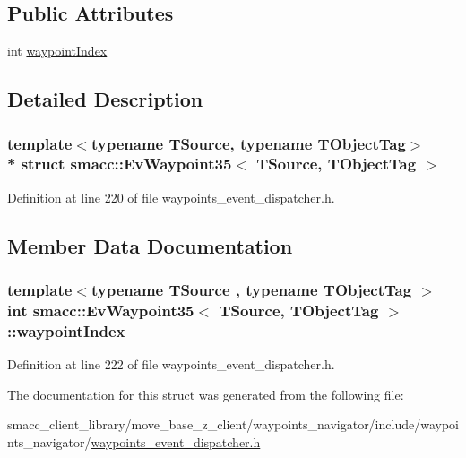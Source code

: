 \subsection*{Public Attributes}
\begin{DoxyCompactItemize}
\item 
int \hyperlink{structsmacc_1_1EvWaypoint35_a3caf329d3822d8b8daa1498c97523677}{waypoint\+Index}
\end{DoxyCompactItemize}


\subsection{Detailed Description}
\subsubsection*{template$<$typename T\+Source, typename T\+Object\+Tag$>$\\*
struct smacc\+::\+Ev\+Waypoint35$<$ T\+Source, T\+Object\+Tag $>$}



Definition at line 220 of file waypoints\+\_\+event\+\_\+dispatcher.\+h.



\subsection{Member Data Documentation}
\subsubsection[{\texorpdfstring{waypoint\+Index}{waypointIndex}}]{\setlength{\rightskip}{0pt plus 5cm}template$<$typename T\+Source , typename T\+Object\+Tag $>$ int {\bf smacc\+::\+Ev\+Waypoint35}$<$ T\+Source, T\+Object\+Tag $>$\+::waypoint\+Index}\hypertarget{structsmacc_1_1EvWaypoint35_a3caf329d3822d8b8daa1498c97523677}{}\label{structsmacc_1_1EvWaypoint35_a3caf329d3822d8b8daa1498c97523677}


Definition at line 222 of file waypoints\+\_\+event\+\_\+dispatcher.\+h.



The documentation for this struct was generated from the following file\+:\begin{DoxyCompactItemize}
\item 
smacc\+\_\+client\+\_\+library/move\+\_\+base\+\_\+z\+\_\+client/waypoints\+\_\+navigator/include/waypoints\+\_\+navigator/\hyperlink{waypoints__event__dispatcher_8h}{waypoints\+\_\+event\+\_\+dispatcher.\+h}\end{DoxyCompactItemize}
